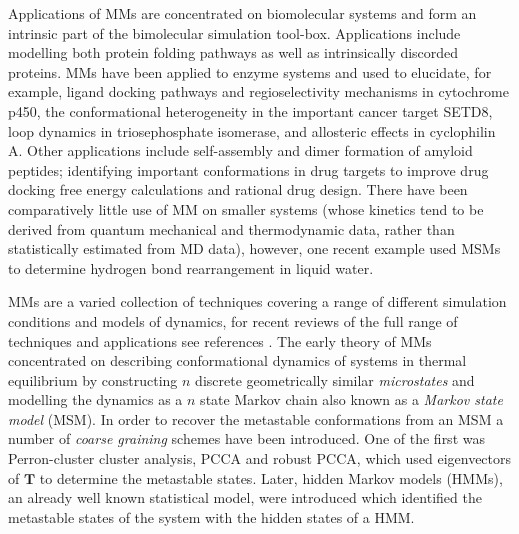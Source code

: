 Applications of MMs are concentrated on biomolecular systems and form an intrinsic part of the bimolecular simulation tool-box\cite{hugginsBiomolecularSimulationsDynamics2019}. Applications include modelling both protein folding pathways\cite{singhalUsingPathSampling2004,swopeDescribingProteinFolding2004} as well as intrinsically discorded proteins\cite{schorAnalyticalMethodsStructural2016a}. 
MMs have been applied to enzyme systems and used to elucidate, for example, ligand docking pathways\cite{ahalawatMappingSubstrateRecognition2018a} and regioselectivity mechanisms in cytochrome p450\cite{dodaniDiscoveryRegioselectivitySwitch2016a}, the conformational heterogeneity in the important cancer target SETD8\cite{chenDynamicConformationalLandscape2019a}, loop dynamics in triosephosphate isomerase\cite{LoopMotionTriosephosphate}, and allosteric effects in cyclophilin A\cite{wapeesittipanAllostericEffectsCyclophilin2019}. Other applications include self-assembly\cite{senguptaAutomatedMarkovState2019} and dimer formation\cite{leahyCoarseMasterEquations2016} of amyloid peptides; identifying important conformations in drug targets to improve drug docking free energy calculations\cite{amaroEnsembleDockingDrug2018} and rational drug design\cite{gervasioBiomolecularSimulationsStructureBased2019}. There have been comparatively little use of MM on smaller systems (whose kinetics tend to be derived from quantum mechanical and thermodynamic data\cite{glowackiMESMEROpenSourceMaster2012, pillingMasterEquationModels2003}, rather than statistically estimated from MD data), however, one recent example used MSMs to determine hydrogen bond rearrangement in liquid water\cite{schulzCollectiveHydrogenbondRearrangement2018}. 

MMs are a varied collection of techniques covering a range of different simulation conditions and models of dynamics, for recent reviews of the full range of techniques and applications see references \cite{husicMarkovStateModels2018, noeMarkovModelsMolecular2019b}. The early theory of MMs concentrated on describing conformational dynamics of systems in thermal equilibrium by constructing $n$ discrete geometrically similar \emph{microstates} and modelling the dynamics as a $n$ state Markov chain\cite{singhalUsingPathSampling2004, swopeDescribingProteinFolding2004, prinzMarkovModelsMolecular2011} also known as a \emph{Markov state model} (MSM). In order to recover the metastable conformations from an MSM a number of \emph{coarse graining} schemes have been introduced. One of the first was Perron-cluster cluster analysis, PCCA\cite{deuflhardIdentificationAlmostInvariant2000a} and robust PCCA\cite{deuflhardRobustPerronCluster2005b}, which used eigenvectors of $\mathbf{T}$ to determine the metastable states. Later, hidden Markov models (HMMs), an already well known statistical model\cite{rabinerTutorialHiddenMarkov1989}, were introduced  which  identified the metastable states of the system with the hidden states of a HMM\cite{noeMarkovModelsMolecular2019b}. 

